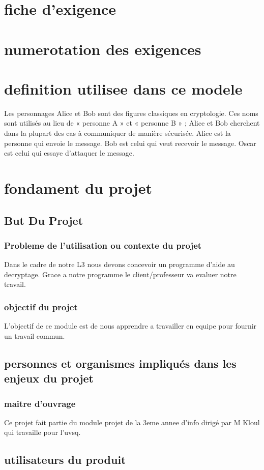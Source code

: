 \documentclass[a4]{article}
\begin{document}
		\section{fiche d'exigence}
		\section{numerotation des exigences}
		\section{definition utilisee dans ce modele}
			Les personnages Alice et Bob sont des figures classiques en cryptologie. Ces noms sont utilisés au lieu de « personne A » et « personne B » ; Alice et Bob cherchent dans la plupart des cas à communiquer de manière sécurisée.
			Alice est la personne qui envoie le message.
			Bob est celui qui veut recevoir le message.
			Oscar est celui qui essaye d'attaquer le message.
	\section{fondament du projet}
		\subsection{But Du Projet} 
			\subsubsection{Probleme de l'utilisation ou contexte du projet}
				Dans le cadre de notre L3 nous devons concevoir un programme d'aide au decryptage.
				Grace a notre programme le client/professeur va evaluer notre travail.
			\subsubsection{objectif du projet}
				L'objectif de ce module est de nous apprendre a travailler en equipe pour fournir un travail commun.
		\subsection{personnes et organismes impliqués dans les enjeux du projet} 
			\subsubsection{maitre d'ouvrage}
				Ce projet fait partie du module projet de la 3eme annee d'info dirigé par M Kloul qui travaille pour l'uvsq.			
		\subsection{utilisateurs du produit}
			
\end{document}
